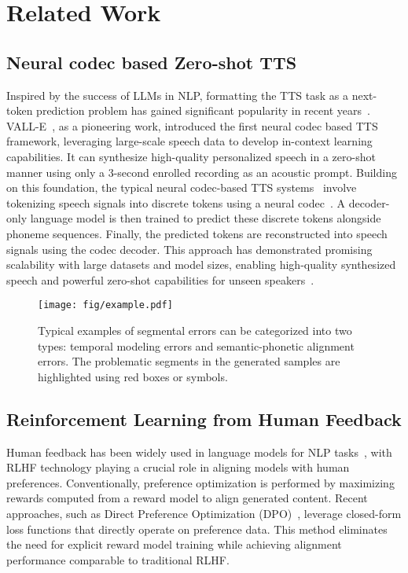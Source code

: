 \section{Related Work}
\subsection{Neural codec based Zero-shot TTS}
Inspired by the success of LLMs in NLP, formatting the TTS task as a next-token prediction problem has gained significant popularity in recent years~\citep{borsos2022audiolm,zhang2023speechgpt}. VALL-E~\citep{wang2023valle}, as a pioneering work, introduced the first neural codec based TTS framework, leveraging large-scale speech data to develop in-context learning capabilities. It can synthesize high-quality personalized speech in a zero-shot manner using only a 3-second enrolled recording as an acoustic prompt. Building on this foundation, the typical neural codec-based TTS systems~\citep{kharitonov2023speak,xin2024ralle,peng2024voicecraft} involve tokenizing speech signals into discrete tokens using a neural codec~\citep{defossez2022high,zeghidour2021soundstream}. A decoder-only language model is then trained to predict these discrete tokens alongside phoneme sequences. Finally, the predicted tokens are reconstructed into speech signals using the codec decoder. This approach has demonstrated promising scalability with large datasets and model sizes, enabling high-quality synthesized speech and powerful zero-shot capabilities for unseen speakers~\citep{lajszczak2024base, du2024cosyvoice}.

\begin{figure*}[ht]
  \centering
  \texttt{[image: fig/example.pdf]}
  \caption{Typical examples of segmental errors can be categorized into two types: temporal modeling errors and semantic-phonetic alignment errors. The problematic segments in the generated samples are highlighted using red boxes or symbols.}
  \label{fig:example}
  \vspace{-15pt}
\end{figure*}

\subsection{Reinforcement Learning from Human Feedback}
Human feedback has been widely used in language models for NLP tasks~\citep{ouyang2022training}, with RLHF technology playing a crucial role in aligning models with human preferences. Conventionally, preference optimization is performed by maximizing rewards computed from a reward model to align generated content. Recent approaches, such as Direct Preference Optimization (DPO)~\citep{rafailov2024dpo}, leverage closed-form loss functions that directly operate on preference data. This method eliminates the need for explicit reward model training while achieving alignment performance comparable to traditional RLHF.

